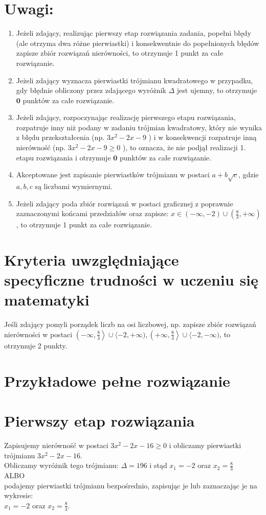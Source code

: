 \documentclass[10pt]{article}
\begin{document}
\section*{Uwagi:}
\begin{enumerate}
  \item Jeżeli zdający, realizując pierwszy etap rozwiązania zadania, popełni błędy (ale otrzyma dwa różne pierwiastki) i konsekwentnie do popełnionych błędów zapisze zbiór rozwiązań nierówności, to otrzymuje 1 punkt za całe rozwiązanie.
  \item Jeżeli zdający wyznacza pierwiastki trójmianu kwadratowego w przypadku, gdy błędnie obliczony przez zdającego wyróżnik $\Delta$ jest ujemny, to otrzymuje $\mathbf{0}$ punktów za całe rozwiązanie.
  \item Jeżeli zdający, rozpoczynając realizację pierwszego etapu rozwiązania, rozpatruje inny niż podany w zadaniu trójmian kwadratowy, który nie wynika z błędu przekształcenia (np. $3 x^{2}-2 x-9$ ) i w konsekwencji rozpatruje inną nierówność (np. $3 x^{2}-2 x-9 \geq 0$ ), to oznacza, że nie podjął realizacji 1. etapu rozwiązania i otrzymuje $\mathbf{0}$ punktów za całe rozwiązanie.
  \item Akceptowane jest zapisanie pierwiastków trójmianu w postaci $a+b \sqrt{c}$, gdzie $a, b, c$ są liczbami wymiernymi.
  \item Jeżeli zdający poda zbiór rozwiązań w postaci graficznej z poprawnie zaznaczonymi końcami przedziałów oraz zapisze: $x \in(-\infty,-2) \cup\left(\frac{8}{3},+\infty\right)$, to otrzymuje 1 punkt za całe rozwiązanie.
\end{enumerate}

\section*{Kryteria uwzględniające specyficzne trudności w uczeniu się matematyki}
Jeśli zdający pomyli porządek liczb na osi liczbowej, np. zapisze zbiór rozwiązań nierówności w postaci $\left(-\infty, \frac{8}{3}\right\rangle \cup\langle-2,+\infty),\left(+\infty, \frac{8}{3}\right\rangle \cup\langle-2,-\infty)$, to otrzymuje 2 punkty.

\section*{Przykładowe pełne rozwiązanie}
\section*{Pierwszy etap rozwiązania}
Zapisujemy nierówność w postaci $3 x^{2}-2 x-16 \geq 0$ i obliczamy pierwiastki trójmianu $3 x^{2}-2 x-16$.\\
Obliczamy wyróżnik tego trójmianu: $\Delta=196$ i stąd $x_{1}=-2$ oraz $x_{2}=\frac{8}{3}$\\
ALBO\\
podajemy pierwiastki trójmianu bezpośrednio, zapisując je lub zaznaczając je na wykresie:\\
$x_{1}=-2$ oraz $x_{2}=\frac{8}{3}$.
\end{document}
